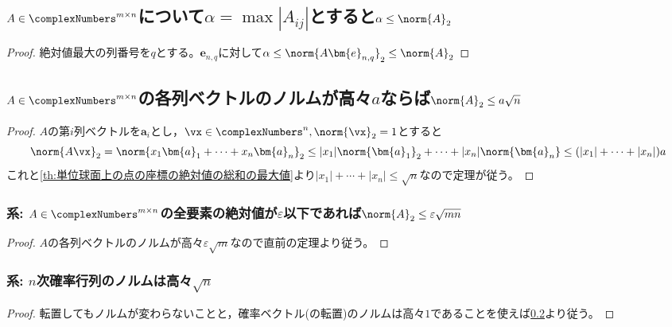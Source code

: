         \subsection{\texorpdfstring{$A \in \complexNumbers^{m\times n}$}{A∈C\string^(m×n)}について\texorpdfstring{$\alpha = \max|A_{ij}|$}{α = max|A\_(i,j)|}とすると\texorpdfstring{$\alpha \leq \norm{A}_2$}{α ≤ ||A||\_2}}
            \begin{proof}
                絶対値最大の列番号を$q$とする。$\bm{e}_{n,q}$に対して$\alpha \leq \norm{A\bm{e}_{n,q}}_2 \leq \norm{A}_2$
            \end{proof}
        \subsection{\texorpdfstring{$A\in\complexNumbers^{m\times n}$}{A∈C\string^(m×n)}の各列ベクトルのノルムが高々\texorpdfstring{$a$}{a}ならば\texorpdfstring{$\norm{A}_2\leq a\sqrt{n}$}{||A||\_2 ≤ a√n}}
            \label{th:mxn実行列Aの各列ベクトルのノルムが高々aならなAのノルムは高々a.sqrt(n)}
            \begin{proof}
                $A$の第$i$列ベクトルを$\bm{a}_i$とし，$\vx\in\complexNumbers^n,\norm{\vx}_2=1$とすると
                \[\norm{A\vx}_2=\norm{x_1\bm{a}_1+\dotsb+x_n\bm{a}_n}_2 \leq |x_1|\norm{\bm{a}_1}_2 + \dotsb + |x_n|\norm{\bm{a}_n} \leq (|x_1|+\dotsb+|x_n|)a\]
                これと\ref{th:単位球面上の点の座標の絶対値の総和の最大値}より$|x_1|+\dotsb+|x_n|\leq\sqrt{n}$なので定理が従う。
            \end{proof}
            \subsubsection{系: \texorpdfstring{$A\in\complexNumbers^{m\times n}$}{A∈C\string^(m×n)}の全要素の絶対値が\texorpdfstring{$\varepsilon$}{ε}以下であれば\texorpdfstring{$\norm{A}_2\leq \varepsilon\sqrt{mn}$}{||A||\_2 ≤ ε√(mn)}}
                \begin{proof}
                    $A$の各列ベクトルのノルムが高々$\varepsilon\sqrt{m}$なので直前の定理より従う。
                \end{proof}
            \subsubsection{系: \texorpdfstring{$n$}{n}次確率行列のノルムは高々\texorpdfstring{$\sqrt{n}$}{√n}}
                \begin{proof}
                    転置してもノルムが変わらないことと，確率ベクトル(の転置)のノルムは高々$1$であることを使えば\ref{th:mxn実行列Aの各列ベクトルのノルムが高々aならなAのノルムは高々a.sqrt(n)}より従う。
                \end{proof}